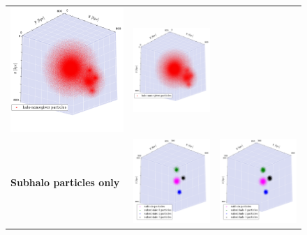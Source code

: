 \begin{subfigures}
\begin{figure}[!htbp]
{\begin{tabular}{|p{.5cm} c c|}
				{\includegraphics[width = .42\textwidth]{images/dice-sub/dice-sub-halo-only-saddle.png}} \hspace*{-1em} 		&
				{\includegraphics[width = .42\textwidth]{images/dice-sub/dice-sub-halo-only-iter.png}} \hspace*{-1em}		\\
				\begin{sideways}{ \hspace{2cm}\textbf{Subhalo particles only} }\end{sideways}	 \hspace*{-1em}			 &
				{\includegraphics[width = .42\textwidth]{images/dice-sub/dice-sub-plot-subclumps-saddle.png}} &
				{\includegraphics[width = .42\textwidth]{images/dice-sub/dice-sub-plot-subclumps-iter.png}} \\

\end{tabular}}
\end{figure}
\end{subfigures}
